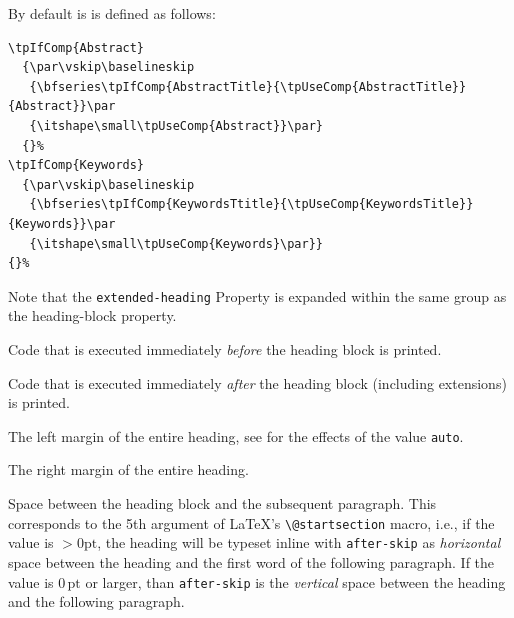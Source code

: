 By default is is defined as follows:
\begin{lstlisting}[style=tex]
\tpIfComp{Abstract}
  {\par\vskip\baselineskip
   {\bfseries\tpIfComp{AbstractTitle}{\tpUseComp{AbstractTitle}}{Abstract}}\par
   {\itshape\small\tpUseComp{Abstract}}\par}
  {}%
\tpIfComp{Keywords}
  {\par\vskip\baselineskip
   {\bfseries\tpIfComp{KeywordsTtitle}{\tpUseComp{KeywordsTitle}}{Keywords}}\par
   {\itshape\small\tpUseComp{Keywords}\par}}
{}%
\end{lstlisting}

Note that the \lstinline{extended-heading} Property is expanded within
the same group as the heading-block property.


Code that is executed immediately \textit{before} the heading block is
printed.


Code that is executed immediately \textit{after} the heading block
(including extensions) is printed.


The left margin of the entire heading, see 
for the effects of the value \lstinline{auto}.


The right margin of the entire heading.


Space between the heading block and the subsequent paragraph. This
corresponds to the 5th argument of \LaTeX's \lstinline{\@startsection}
macro, i.e., if the value is ${}> 0\mathrm{pt}$, the heading will be typeset inline
with \lstinline{after-skip} as \textit{horizontal} space between the
heading and the first word of the following paragraph. If the value is
$0\,\mathrm{pt}$ or larger, than \lstinline{after-skip} is the
\textit{vertical} space between the heading and the following
paragraph.

